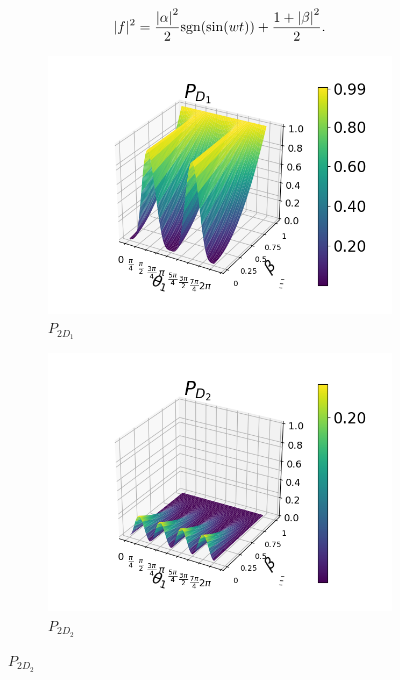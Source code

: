 \documentclass[12pt]{book}
\begin{document}
\begin{equation}
|f|^2=  \frac{\abs{\alpha}^2}{2} \mathrm{sgn}(\sin(wt)) +\frac{1+\abs{\beta}^2}{2}.
\end{equation}

\begin{figure}[t!]
\centering
\begin{subfigure}[b]{0.4\linewidth}
\includegraphics[width=\linewidth]{images/PD1_h.png}
\caption{$P_{2D_{1}}$}
\label{fig:BS1}
\end{subfigure}
\begin{subfigure}[b]{0.4\linewidth}
\includegraphics[width=\linewidth]{images/PD2_h.png}
\caption{$P_{2D_{2}}$}
\label{fig:westminster_aerea}
\end{subfigure}

\end{figure}
\end{document}
